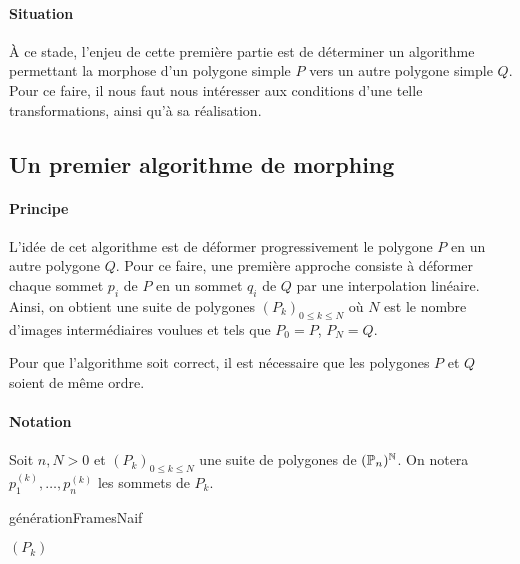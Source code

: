 



\paragraph{Situation} À ce stade, l'enjeu de cette première partie est de déterminer un algorithme permettant 
la morphose d'un polygone simple $P$ vers un autre polygone simple $Q$. Pour ce faire, il nous faut nous intéresser
aux conditions d'une telle transformations, ainsi qu'à sa réalisation.

\subsection[Morphing naif]{Un premier algorithme de morphing}
\label{sec:morphing-naif}
\paragraph{Principe} L'idée de cet algorithme est de déformer progressivement le polygone $P$ en un autre polygone $Q$.
Pour ce faire, une première approche consiste à déformer chaque sommet $p_i$ de $P$ en un sommet $q_i$ de $Q$ par
une interpolation linéaire. Ainsi, on obtient une suite de polygones $(P_{k})_{0\leq k\leq N}$ 
où $N$ est le nombre d'images intermédiaires voulues et tels que $P_{0}=P$, $P_{N}=Q$.

\begin{coder}
    Pour que l'algorithme soit correct, il est nécessaire que les polygones $P$ et $Q$ soient de même ordre.
\end{coder}

\paragraph*{Notation} Soit $n,N>0$ et $(P_k)_{0\leq k\leq N}$ une suite de polygones de $(\mathbb{P}_{n})^{\mathbb{N}}$.
 On notera $p^{(k)}_1,\ldots,p^{(k)}_n$ les sommets de $P_k$.


\begin{algorithm}[H]
    \caption{générationFramesNaif}\label{alg:0}
    \SetAlgoLined
    
    \Return $(P_k)$
\end{algorithm}

